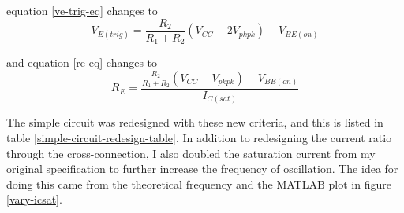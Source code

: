 \documentclass[titlepage, letterpaper, 10.5pt]{article}
\begin{document}
equation \ref{ve-trig-eq} changes to
\begin{equation}
V_{E(trig)}=\frac{R_{2}}{R_{1}+R_{2}}(V_{CC}-2V_{pkpk})-V_{BE(on)}
\label{redesigned-ve-trig-eq}
\end{equation}

and equation \ref{re-eq} changes to
\begin{equation}
R_{E}=\frac{\frac{R_{2}}{R_{1}+R_{2}}(V_{CC}-V_{pkpk})-V_{BE(on)}}{I_{C(sat)}}
\label{redesigned-re-eq}
\end{equation}

The simple circuit was redesigned with these new criteria, and this is listed
in table \ref{simple-circuit-redesign-table}. In addition to redesigning the
current ratio through the cross-connection, I also doubled the saturation current
from my original specification to further increase the frequency of oscillation.
The idea for doing this came from the theoretical frequency and the MATLAB plot
in figure \ref{vary-icsat}.
\end{document}
